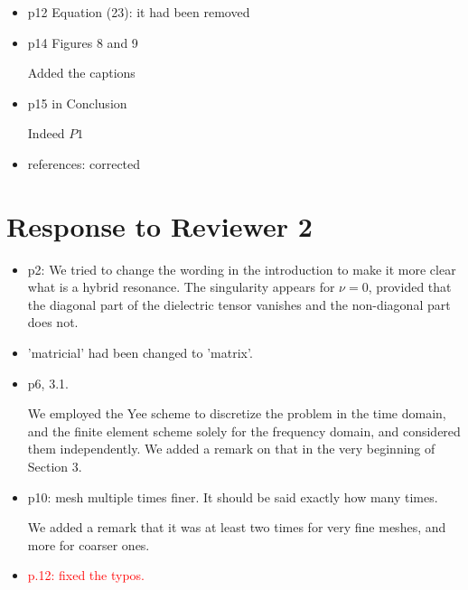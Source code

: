 \documentclass[a4paper,10pt]{article}
\begin{document}
\begin{itemize}
  
\item p12 Equation (23): it had been removed
  
\item p14 Figures 8 and 9

Added the captions  


\item p15 in Conclusion

  Indeed $P1$
  
\item references: corrected
  \end{itemize}


\section{Response to  Reviewer 2}
 \begin{itemize}
\item p2:  We tried to change the wording in the introduction to make it more clear what is a hybrid resonance. 
The singularity appears for $\nu=0$, provided that the diagonal part of the dielectric tensor vanishes and the non-diagonal part does not. 

\item 'matricial' had been changed to 'matrix'.

\item p6, 3.1. 

We employed the Yee scheme to discretize the problem in the time domain, and the finite element scheme solely for the frequency domain, 
and considered them independently. We added a remark on that in the very beginning of Section 3. 

\item p10: mesh multiple times finer. It should be said exactly how many times. 

We added a remark that it was at least two times for very fine meshes, and more for coarser ones.

\item {\textcolor{red}{p.12: fixed the typos. }}
\end{itemize}

  
 
\end{document}

